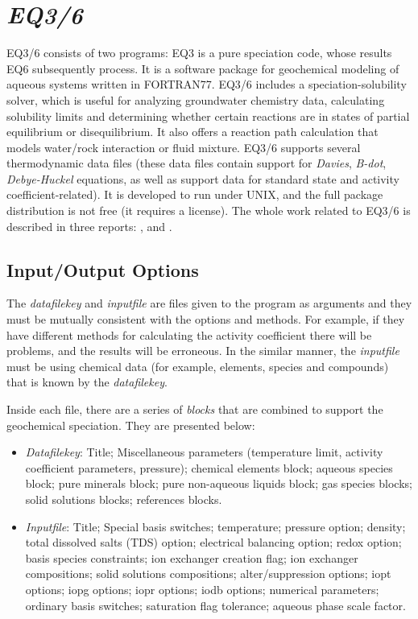 \section{\emph{EQ3/6}}
EQ3/6 consists of two programs: EQ3 is a pure speciation code, whose results EQ6 subsequently process. It is a software package for geochemical modeling of aqueous systems written in FORTRAN77. 
EQ3/6 includes a speciation-solubility solver, which is useful for analyzing groundwater chemistry data, calculating solubility limits and determining whether certain reactions are in states of partial equilibrium or disequilibrium. It also offers a reaction path calculation that models water/rock interaction or fluid mixture. 
EQ3/6 supports several thermodynamic data files (these data files contain support for \emph{Davies}, \emph{B-dot}, \emph{Debye-Huckel} equations, as well as support data for standard state and activity coefficient-related). 
It is developed to run under UNIX, and the full package distribution is not free (it requires a license). The whole work related to EQ3/6 is described in three reports: \cite{Wolery:1979}, \cite{Wolery:1990} and \cite{Wolery:1992}.

\subsection{Input/Output Options}
The \emph{datafilekey} and \emph{inputfile} are files given to the program as arguments and they must be mutually consistent with the options and methods. For example, if they have different methods for calculating the activity coefficient there will be problems, and the results will be erroneous. In the similar manner, the \emph{inputfile} must be using chemical data (for example, elements, species and compounds) that is known by the \emph{datafilekey}.

Inside each file, there are a series of \emph{blocks} that are combined to support the geochemical speciation. They are presented below:
\begin{itemize}
\item \emph{Datafilekey}: Title; Miscellaneous parameters (temperature limit, activity coefficient parameters, pressure); chemical elements block; aqueous species block; pure minerals block; pure non-aqueous liquids block; gas species blocks; solid solutions blocks; references blocks.
\item \emph{Inputfile}: Title; Special basis switches; temperature; pressure option; density; total dissolved salts (TDS) option; electrical balancing option; redox option; basis species constraints; ion exchanger creation flag; ion exchanger compositions; solid solutions compositions; alter/suppression options; iopt options; iopg options; iopr options; iodb options; numerical parameters; ordinary basis switches; saturation flag tolerance; aqueous phase scale factor.
\end{itemize}

